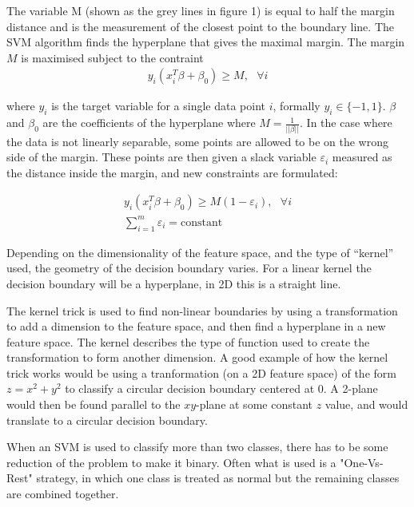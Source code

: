 \documentclass[a4paper,11pt,twoside]{article}
\begin{document}
The variable M (shown as the grey lines in figure 1) is equal to half the margin distance and is the measurement of the closest point to the boundary line. The SVM algorithm finds the hyperplane that gives the maximal margin. The margin $M$ is maximised subject to the contraint
\begin{equation}
\begin{gathered}
y_i(x_i^T \beta+\beta_0)\geq M,\text{ } \forall i
\end{gathered}
\end{equation}

where $y_i$ is the target variable for a single data point $i$, formally $y_i \in \{-1, 1\}$. $\beta$ and $\beta_0$ are the coefficients of the hyperplane where $M=\frac{1}{||\beta||}$\cite{hastie01statisticallearning}. In the case where the data is not linearly separable, some points are allowed to be on the wrong side of the margin. These points are then given a slack variable $\varepsilon_i$ measured as the distance inside the margin, and new constraints are formulated:

\begin{equation}
\begin{gathered}
y_i(x_i^T \beta+\beta_0)\geq M(1-\varepsilon_i),\text{ } \forall i
\\
\sum_{i=1}^m\varepsilon_i = \text{constant}
\end{gathered}
\end{equation}

Depending on the dimensionality of the feature space, and the type of “kernel” used, the geometry of the decision boundary varies. For a linear kernel the decision boundary will be a hyperplane, in 2D this is a straight line. 
\newline

The kernel trick is used to find non-linear boundaries by using a transformation to add a dimension to the feature space, and then find a hyperplane in a new feature space\cite{Boser1992}. The kernel describes the type of function used to create the transformation to form another dimension. A good example of how the kernel trick works would be using a tranformation (on a 2D feature space) of the form $z=x^2+y^2$ to classify a circular decision boundary centered at 0. A 2-plane would then be found parallel to the $xy$-plane at some constant $z$ value, and would translate to a circular decision boundary.
\newline

When an SVM is used to classify more than two classes, there has to be some reduction of the problem to make it binary. Often what is used is a "One-Vs-Rest" strategy, in which one class is treated as normal but the remaining classes are combined together.
\end{document}
